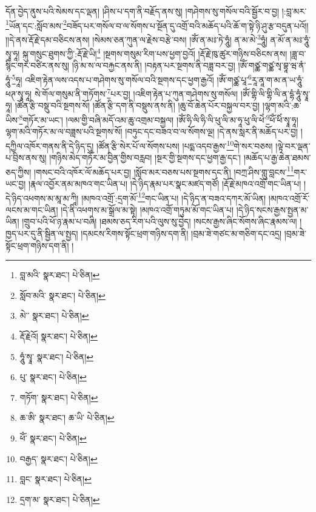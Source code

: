 དོན་བྱེད་ནུས་པའི་སེམས་དང་ལྡན། །ཤིས་པ་དག་ནི་བརྗོད་ནས་སུ། །གཤེགས་སུ་གསོལ་བའི་སྦྱོར་བ་བྱ། །:བླ་མར་\footnote{བླ་མའི་  སྣར་ཐང་།  པེ་ཅིན། }ཡོན་དང་:སློབ་མས་\footnote{སློབ་མའི་  སྣར་ཐང་།  པེ་ཅིན། }བཟོད་པར་གསོལ་བ་ལ་སོགས་པ་སྔོན་དུ་འགྲོ་བའི་མཆོད་པའི་ཆོ་ག་སྟེ་ཉི་ཤུ་རྩ་བདུན་པའོ།། །།དེ་ནས་རྡོ་རྗེ་དམ་བཅིངས་ནས། །སེམས་ཅན་ཀུན་ལ་རྗེས་བརྩེ་བས། །ཨོཾ་ན་མཿ་ཏེ་ཧཱུཾ། ན་མ་མེ་\footnote{མེ་་  སྣར་ཐང་།  པེ་ཅིན། }ཧཱུཾ། ན་མོ་ན་མཿ་ཧཱུཾ་སྭཱ་ཧཱ། སྐུ་གསུང་ཐུགས་ཀྱི་:རྡོ་རྗེ་ཡི།\footnote{རྡོ་རྗེའོ།  སྣར་ཐང་།  པེ་ཅིན། } །སྔགས་གསུམ་རིག་པས་ཕྱག་བྱའོ། །རྡོ་རྗེ་ཁུ་ཚུར་གཉིས་བཅིངས་ནས། །ཟླ་བ་སྙིང་གར་བཙིར་ནས་སུ། །ཉི་མ་ས་ལ་བརྐྱང་ནས་ནི། །བརྟན་པར་སྔགས་ནི་བཟླ་བར་བྱ། །ཨོཾ་གཙྪ་གཙྪ་སྭ་བྷཱ་ཝ་ནཾ་ཧཱུཾ་\footnote{ཧཱུཾ་སྭཱ་  སྣར་ཐང་།  པེ་ཅིན། }ཧཱ། འཇིག་རྟེན་ལས་འདས་པ་གཤེགས་སུ་གསོལ་བའི་སྔགས་དང་ཕྱག་རྒྱའོ། །ཨོཾ་གཙྪ་པཱ་\footnote{པུ་  སྣར་ཐང་།  པེ་ཅིན། }རཱ་ནཱ་ག་མ་ན་ཡ་ཧཱུཾ་ཕཊ་སྭཱ་ཧཱ། སེ་གོལ་གསུམ་ནི་གཏོགས་\footnote{གཏོག་  སྣར་ཐང་།  པེ་ཅིན། }པར་བྱ། །འཇིག་རྟེན་པ་ཀུན་གཤེགས་སུ་གསོལ། །ཨོཾ་གྷི་ལི་གྷི་ལི་ན་དྷཾ་ཧཱུཾ་སྭཱ་ཧཱ། །ཚོན་རྩི་བསྡུ་བའི་སྔགས་སོ། །ཚོན་རྩི་དག་ནི་བསྡུས་ནས་ནི། །ཆུ་བོ་ཆེན་པོར་བསྐྱལ་བར་བྱ། །ལྷག་མའི་:ཆ་ཡིས་\footnote{ཆ་ཨི་  སྣར་ཐང་། ཆ་ཡི་  པེ་ཅིན། }གཏོར་མ་ཡང་། །ལམ་གྱི་བཞི་མདོ་འམ་ཆུ་འགྲམ་བསྐྱལ། །ཨོཾ་ཧི་ལི་ཧི་ལི་ཕུ་ལི་མ་ཧཱ་ཕུ་ལི་ཕེཾ་\footnote{ཕོཾ་  སྣར་ཐང་།  པེ་ཅིན། }ཕོཾ་ཕིཾ་སྭཱ་ཧཱ། ལྷག་མའི་གཏོར་མ་ལ་བཟླས་པའི་སྔགས་སོ། །བཏུང་དང་བཟའ་བ་ལ་སོགས་ལྔ། །དེ་ནས་སླར་ནི་མཆོད་པར་བྱ། །དཀྱིལ་འཁོར་གནས་ནི་དེ་ཉིད་དུ། །ཚོན་རྩི་སེར་པོ་ལ་སོགས་པས། །པདྨ་འདབ་རྒྱས་\footnote{བརྒྱད་  སྣར་ཐང་།  པེ་ཅིན། }གེ་སར་བཅས། །ལྟེ་བར་ལྡན་པ་བྲིས་ནས་སུ། །གཉིས་མེད་གཏོར་མ་བྱིན་གྱིས་བརླབ། །སྔར་གྱི་སྔགས་དང་ཕྱག་རྒྱ་དང་། །མཆོད་པ་རྒྱ་ཆེན་ཐམས་ཅད་ཀྱིས། །གསང་བའི་འཁོར་ལོ་མཆོད་པར་བྱ། །སློབ་མར་བཅས་པས་སྔགས་དང་ནི། །བཀྲ་ཤིས་གླུ་བླངས་\footnote{བླང་  སྣར་ཐང་།  པེ་ཅིན། }གར་ཡང་བྱ། །རྣལ་འབྱོར་ནམ་མཁའ་གང་ཡིན་པ། །དེ་ཉིད་རྣམ་པར་སྣང་མཛད་གཙོ། །རྡོ་རྗེ་མཁའ་འགྲོ་གང་ཡིན་པ། །དེ་ཉིད་འཕགས་མ་མཱ་མ་ཀཱི། །མཁའ་འགྲོ་:དྲག་མོ་\footnote{དྲག་མ་  སྣར་ཐང་།  པེ་ཅིན། }གང་ཡིན་པ། །དེ་ཉིད་ན་བཟའ་དཀར་མོ་ཡིན། །མཁའ་འགྲོ་རོ་ལངས་མ་གང་ཡིན། །དེ་ནི་འཕགས་མ་སྒྲོལ་མ་སྟེ། །མཁའ་འགྲོ་གཏུམ་མོ་གང་ཡིན་པ། །དེ་ཉིད་སངས་རྒྱས་སྤྱན་མ་ཡིན། །གྲུབ་པའི་ཕོ་ཉ་རྣམ་པ་བཞི། །ཐམས་ཅད་རིག་པའི་ལུས་སུ་བྱེད། །སངས་རྒྱས་ཞིང་སོགས་ཞིང་རྣམས་ལ། །ཁྱད་པར་དུ་ནི་སྦྱིན་ལ་སྤྱད། །དམངས་རིགས་སྟོང་ཕྲག་གཉིས་དག་ནི། །བྲམ་ཟེ་གཙང་མ་གཅིག་དང་འདྲ། །བྲམ་ཟེ་སྟོང་ཕྲག་གཉིས་དག་ནི། །
